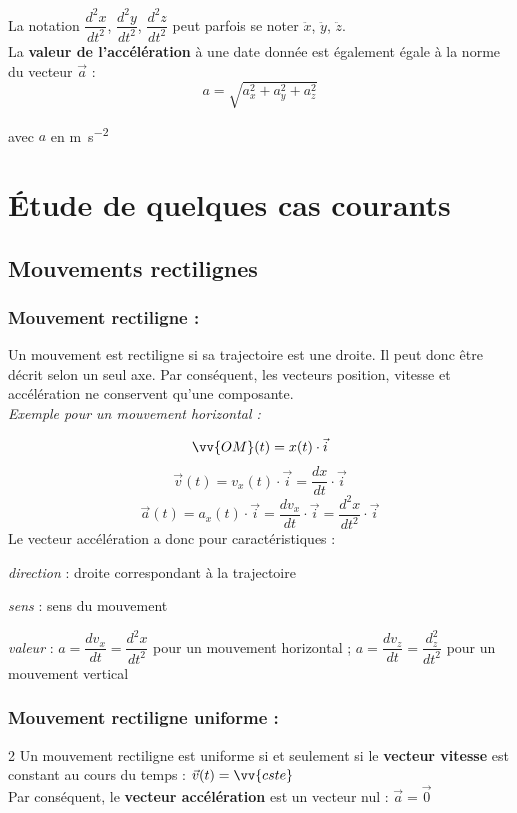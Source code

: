 \documentclass[a4paper,11pt,fleqn]{article}%
\begin{document}
La notation $\dfrac{d^2x}{dt^2}$, $\dfrac{d^2y}{dt^2}$, $\dfrac{d^2z}{dt^2}$ peut parfois se noter $\ddot{x}$, $\ddot{y}$, $\ddot{z}$.\\

La \textbf{valeur de l'accélération} à une date donnée est également égale à la norme du vecteur $\vec{a}$ :
$$a=\sqrt{a_x^2 + a_y^2 + a_z^2}$$
\begin{center} avec $a$ en \unit{\meter\per\second\squared} \end{center}

\section{Étude de quelques cas courants}
	\subsection{Mouvements rectilignes}
		\subsubsection*{Mouvement rectiligne :}
		Un mouvement est rectiligne si sa trajectoire est une droite. Il peut donc être décrit selon un seul axe. Par conséquent, les vecteurs position, vitesse et accélération ne conservent qu'une composante.\\ \emph{Exemple pour un mouvement horizontal :}
		
		$$\vv{OM}(t) = x(t) \cdot \vec{i}$$
		$$\vec{v}(t) = v_x(t) \cdot \vec{i} = \dfrac{dx}{dt} \cdot \vec{i}$$
		$$\vec{a}(t) = a_x(t) \cdot \vec{i} = \dfrac{dv_x}{dt} \cdot \vec{i} =\dfrac{d^2x}{dt^2} \cdot \vec{i}$$
\newpage
		Le vecteur accélération a donc pour caractéristiques :
		\begin{itemize*}
			\item \textit{direction} : droite correspondant à la trajectoire
			\item \textit{sens} : sens du mouvement
			\item \textit{valeur} : $a=\dfrac{dv_x}{dt} = \dfrac{d^2x}{dt^2}$ pour un mouvement horizontal ; $a=\dfrac{dv_z}{dt} = \dfrac{d^2_z}{dt^2}$ pour un mouvement vertical
		\end{itemize*}
		
	\subsubsection*{Mouvement rectiligne uniforme :}

\begin{multicols}{2}
		Un mouvement rectiligne est uniforme si et seulement si le \textbf{vecteur vitesse} est constant au cours du temps : $\vec{v}(t) = \vv{cste}$\\
		Par conséquent, le \textbf{vecteur accélération} est un vecteur nul : $\vec{a} = \vec{0}$
		
\columnbreak

\noindent {}
\end{multicols}
\end{document}
